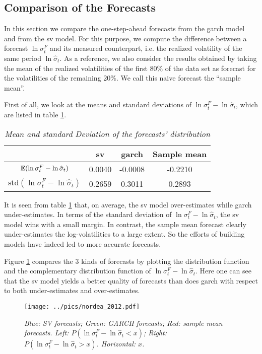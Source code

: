 \subsection{Comparison of the Forecasts}
In this section we compare the one-step-ahead forecasts from the \gls{garch}
model and from the \gls{sv} model. For this purpose, we
compute the difference between a forecast $\ln \sigma^F_t$ and its measured
counterpart, i.e. the realized volatility of the same period $\ln
\hat{\sigma}_t$. As a reference, we also consider the results obtained
by taking the mean of the realized volatilities of the first 80\% of
the data set as forecast for the volatilities of the remaining 20\%. We
call this naive forecast the ``sample mean''.

First of all, we look at the means and standard deviations of $\ln \sigma^F_t -
\ln \hat{\sigma}_t$, which are listed in table \ref{tab:nordea_2012}.
\begin{table}[htb!]
  \centering
  \begin{tabular}{|c|c|c|c|}
    \hline
    & \gls{sv} & \gls{garch} & Sample mean \\
    \hline
    $\mathbb{E}(\ln \sigma^F_t - \ln \hat{\sigma}_t)$ & 0.0040 & -0.0008 &
    -0.2210 \\
    \hline
    $\text{std}(\ln \sigma^F_t - \ln \hat{\sigma}_t)$ & 0.2659 & 0.3011 &
    0.2893 \\
    \hline
  \end{tabular}
  \caption{\small \it Mean and standard Deviation of the forecasts'
    distribution}
  \label{tab:nordea_2012}
\end{table}
It is seen from table \ref{tab:nordea_2012} that, on average, the \gls{sv}
model over-estimates while \gls{garch} under-estimates. In terms of the
standard deviation of $\ln \sigma^F_t - \ln \hat{\sigma}_t$, the \gls{sv}
model wins with a small margin. In contrast, the sample mean forecast
clearly under-estimates the log-volatilities to a large
extent. So the efforts of building models have indeed led
  to more accurate forecasts.

Figure \ref{fig:nordea_2012} compares the 3 kinds of forecasts by
plotting the distribution function and the complementary distribution
function of $\ln \sigma^F_t - \ln \hat{\sigma}_t$. Here one can see
that the \gls{sv} model yields a better quality of forecasts than does \gls{garch} 
with respect to both under-estimates and over-estimates.

\begin{figure}[htb!]
  \centering
    \texttt{[image: ../pics/nordea\_2012.pdf]}
  \caption{\small \it Blue: SV forecasts; Green: GARCH forecasts; Red:
    sample mean forecasts. Left: $P(\ln \sigma^F_t - \ln \hat{\sigma}_t < x)$;
    Right: $P(\ln \sigma^F_t - \ln \hat{\sigma}_t > x)$. Horizontal: $x$.}
  \label{fig:nordea_2012}
\end{figure}

